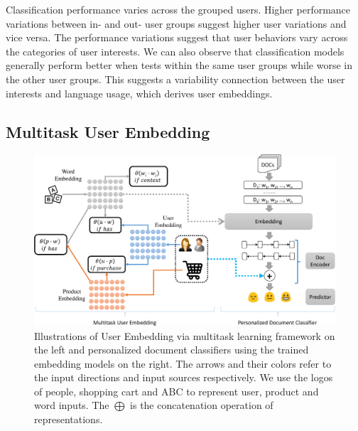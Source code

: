 Classification performance varies across the grouped users.
Higher performance variations between in- and out- user groups suggest higher user variations and vice versa.
The performance variations suggest that user behaviors vary across the categories of user interests. 
We can also observe that classification models generally perform better when tests within the same user groups while worse in the other user groups.
This suggests a variability connection between the user interests and language usage, which derives user embeddings. 





\subsection{Multitask User Embedding}
\label{chap4:subsec:model2}


\begin{figure}[t!]
\centering
\includegraphics[width=1\textwidth]{./images/chapter4/uembedding/userEmbedding-diagram.pdf}
\caption{Illustrations of User Embedding via multitask learning framework on the left and personalized document classifiers using the trained embedding models on the right. The arrows and their colors refer to the input directions and input sources respectively. We use the logos of people, shopping cart and ABC to represent user, product and word inputs. The $\bigoplus$ is the concatenation operation of representations.}
\label{chap4:fig:uemb_diagram}
\end{figure}

